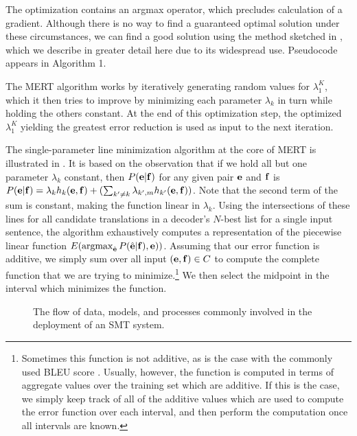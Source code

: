 \noindent The optimization contains an
argmax operator, which precludes calculation
of a gradient.  Although there is
no way to find a guaranteed optimal solution
under these circumstances, we can find
a good solution using the method 
sketched in \citet{Och:2003:acl}, which
we describe in greater detail here due to its 
widespread use.
Pseudocode appears in Algorithm 1.

The MERT algorithm works by iteratively generating
random values for $\lambda_1^K$, which
it then tries to improve by minimizing each parameter
$\lambda_k$ in turn while holding the others constant. At the end of 
this optimization step, the optimized $\lambda_1^K$ yielding
the greatest error reduction is used as input
to the next iteration.

The single-parameter line minimization algorithm at the core of MERT 
is illustrated in .  It
is based on the observation that if we hold all but 
one parameter $\lambda_k$ constant, then $P({\bf e}|{\bf f})$ 
for any given pair ${\bf e}$ and ${\bf f}$ is $P({\bf e}|{\bf f}) = \lambda_k h_k({\bf e},{\bf f}) + 
(\sum_{k'\neq k}\lambda_{k',m}h_{k'}({\bf e},{\bf f}))$.  
Note that the second term of the sum is constant,
making the function linear in $\lambda_k$.
Using the intersections of
these lines for all candidate translations
in a decoder's $N$-best list for a
single input sentence, the algorithm
exhaustively computes a representation of the
piecewise linear function $E(\argmax_{\hat{\e}} P(\hat{\e}|\f),\e))$.
Assuming that our error function is 
additive, we simply sum over all input
$({\bf e},{\bf f})\in C$ to compute the complete function
that we are trying to  minimize.\footnote{Sometimes
this function is not additive, as is
the case with the commonly used BLEU score \citep{Papineni:2002:acl}.
Usually, however, the function is computed in terms of aggregate values
over the training set
which are additive.  If this is the case, we simply keep track of all
of the additive values which are used to compute the error function over
each interval, and then perform the computation once all intervals are 
known.}
We then select the midpoint in the interval which minimizes the 
function.

\figpreamble
\begin{figure*}[t]
\figfontsize{\begin{center}

\end{center}}
\figpostamble
\caption{\label{fig:overview}The flow of data, models, and processes commonly involved in the deployment of an SMT system.}
\end{figure*}



